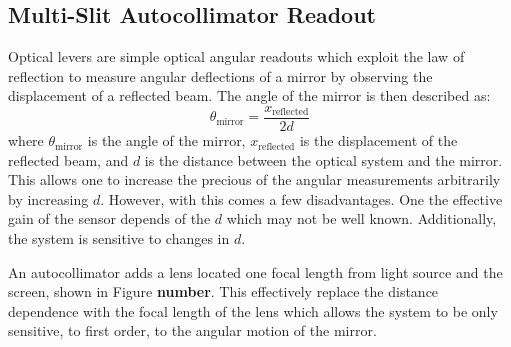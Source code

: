 \documentclass [12pt, proquest]{uwthesis}[2019]
\begin{document}
\subsection{Multi-Slit Autocollimator Readout}

\quad Optical levers are simple optical angular readouts which exploit the law of reflection to measure angular deflections of a mirror by observing the displacement of a reflected beam. The angle of the mirror is then described as:
\begin{equation}
\theta_{\text{mirror}}=\frac{x_{\text{reflected}}}{2d}
\end{equation}
where $\theta_\text{mirror}$ is the angle of the mirror, $x_\text{reflected}$ is the displacement of the reflected beam, and $d$ is the distance between the optical system and the mirror. This allows one to increase the precious of the angular measurements arbitrarily by increasing $d$. However, with this comes a few disadvantages. One the effective gain of the sensor depends of the $d$ which may not be well known. Additionally, the system is sensitive to changes in $d$. 

An autocollimator adds a lens located one focal length from light source and the screen, shown in Figure \textbf{number}. This effectively replace the distance dependence with the focal length of the lens which allows the system to be only sensitive, to first order, to the angular motion of the mirror.
\end{document}
